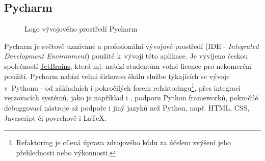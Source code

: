 \begin{sloppypar}
\end{sloppypar}

\subsection{Pycharm}

\begin{figure}[bht]
	\centering
	
	\caption{Logo vývojového prostředí Pycharm}
\end{figure}

Pycharm je světově uznávané a profesionální vývojové prostředí (IDE - \emph{Integrated Development Environment}) použité k~vývoji této aplikace. Je vyvíjeno českou společností \href{https://www.jetbrains.com/}{JetBrains}, která mj. nabízí studentům volné licence pro nekomerční použití. Pycharm nabízí velmi širkovou škálu službe týkajících se vývoje v~Pythonu - od základních i pokročilých forem refaktoringu\footnote{Refaktoring je cílená úprava zdrojového kódu za účelem zvýšení jeho přehlednosti nebo výkonnosti.}, přes integraci verzovacích systémů, jako je například i , podporu Python frameworků, pokročilé debuggovací nástroje až podpoře i jiný jazyků než Python, např. HTML, CSS, Javascript či povrchově i \LaTeX{}.